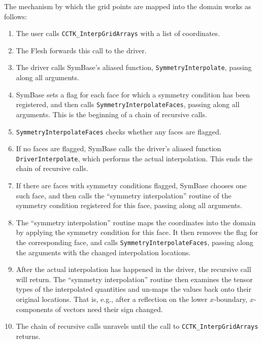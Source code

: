 The mechanism by which the grid points are mapped into the domain
works as follows:
\begin{enumerate}
	\item The user calls \texttt{CCTK\_InterpGridArrays} with a list of
	  coordinates.
	\item The Flesh forwards this call to the driver.
	\item The driver calls SymBase's aliased function,
	  \texttt{SymmetryInterpolate}, passing along all arguments.
	\item SymBase sets a flag for each face for which a symmetry
	  condition has been registered, and then calls
	  \texttt{SymmetryInterpolateFaces}, passing along all arguments.
	  This is the beginning of a chain of recursive calls.
	\item \texttt{SymmetryInterpolateFaces} checks whether any faces are
	  flagged.
	\item If no faces are flagged, SymBase calls the driver's aliased
	  function \texttt{DriverInterpolate}, which performs the actual
	  interpolation.  This ends the chain of recursive calls.
	\item If there are faces with symmetry conditions flagged, SymBase
	  chooses one such face, and then calls the ``symmetry interpolation''
	  routine of the symmetry condition registered for this face,
	  passing along all arguments.
	\item The ``symmetry interpolation'' routine maps the coordinates into
	  the domain by applying the symmetry condition for this face.  It
	  then removes the flag for the corresponding face, and calls
	  \texttt{SymmetryInterpolateFaces}, passing along the arguments with
	  the changed interpolation locations.
	\item After the actual interpolation has happened in the driver, the
	  recursive call will return.  The ``symmetry interpolation'' routine
	  then examines the tensor types of the interpolated quantities and
	  un-maps the values back onto their original locations.  That is,
	  e.g., after a reflection on the lower $x$-boundary, $x$-components
	  of vectors need their sign changed.
	\item The chain of recursive calls unravels until the call to
	  \texttt{CCTK\_InterpGridArrays} returns.
\end{enumerate}


